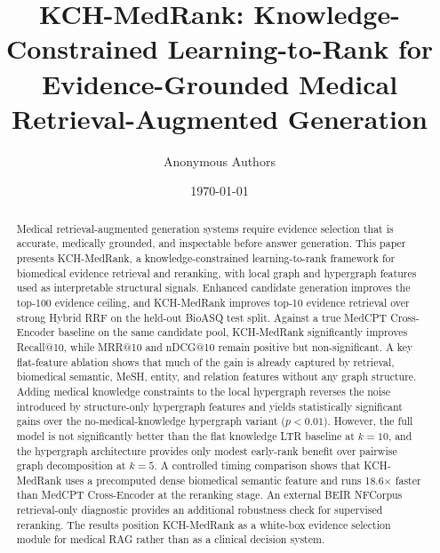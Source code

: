 \documentclass[11pt]{article}
\title{KCH-MedRank: Knowledge-Constrained Learning-to-Rank for Evidence-Grounded Medical Retrieval-Augmented Generation}
\author{Anonymous Authors}
\date{\today}
\begin{document}
\maketitle

\begin{abstract}
Medical retrieval-augmented generation systems require evidence selection that is accurate, medically grounded, and inspectable before answer generation. This paper presents KCH-MedRank, a knowledge-constrained learning-to-rank framework for biomedical evidence retrieval and reranking, with local graph and hypergraph features used as interpretable structural signals. Enhanced candidate generation improves the top-100 evidence ceiling, and KCH-MedRank improves top-10 evidence retrieval over strong Hybrid RRF on the held-out BioASQ test split. Against a true MedCPT Cross-Encoder baseline on the same candidate pool, KCH-MedRank significantly improves Recall@10, while MRR@10 and nDCG@10 remain positive but non-significant. A key flat-feature ablation shows that much of the gain is already captured by retrieval, biomedical semantic, MeSH, entity, and relation features without any graph structure. Adding medical knowledge constraints to the local hypergraph reverses the noise introduced by structure-only hypergraph features and yields statistically significant gains over the no-medical-knowledge hypergraph variant ($p < 0.01$). However, the full model is not significantly better than the flat knowledge LTR baseline at $k{=}10$, and the hypergraph architecture provides only modest early-rank benefit over pairwise graph decomposition at $k{=}5$. A controlled timing comparison shows that KCH-MedRank uses a precomputed dense biomedical semantic feature and runs 18.6$\times$ faster than MedCPT Cross-Encoder at the reranking stage. An external BEIR NFCorpus retrieval-only diagnostic provides an additional robustness check for supervised reranking. The results position KCH-MedRank as a white-box evidence selection module for medical RAG rather than as a clinical decision system.
\end{abstract}











\appendix




\end{document}
